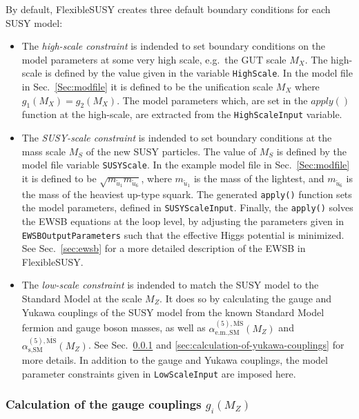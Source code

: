 \documentclass[final,3p,11pt,pdflatex]{elsarticle}
\newcommand{\fs}{FlexibleSUSY\xspace}
\newcommand{\code}[1]{\lstinline|#1|}  %
\newcommand{\textoverline}[1]{$\overline{\mbox{#1}}$}
\newcommand{\MSbar}{\textoverline{MS}\xspace}
\newcommand{\secref}[1]{Sec.~\ref{#1}}
\begin{document}
By default, \fs creates three default boundary conditions for each
SUSY model:
%
\begin{itemize}
\item The \emph{high-scale constraint} is indended to set boundary
  conditions on the model parameters at some very high scale, e.g.\
  the GUT scale $M_X$.  The high-scale is defined by the value given
  in the variable \code{HighScale}.  In the model file in
  \secref{Sec:modfile} it is defined to be the unification scale $M_X$
  where $g_1(M_X) = g_2(M_X)$.  The model parameters which, are set in
  the $apply()$ function at the high-scale, are extracted from the
  \code{HighScaleInput} variable.

\item The \emph{SUSY-scale constraint} is indended to set boundary
  conditions at the mass scale $M_S$ of the new SUSY particles.  The
  value of $M_S$ is defined by the model file variable
  \code{SUSYScale}.  In the example model file in \secref{Sec:modfile}
  it is defined to be $\sqrt{m_{\tilde{u}_1} m_{\tilde{u}_6}}$, where
  $m_{\tilde{u}_1}$ is the mass of the lightest, and $m_{\tilde{u}_6}$
  is the mass of the heaviest up-type squark.  The generated
  \code{apply()} function sets the model parameters, defined in
  \code{SUSYScaleInput}.  Finally, the \code{apply()} solves the EWSB
  equations at the loop level, by adjusting the parameters given in
  \code{EWSBOutputParameters} such that the effective Higgs potential
  is minimized.  See \secref{sec:ewsb} for a more detailed description
  of the EWSB in \fs.

\item The \emph{low-scale constraint} is indended to match the SUSY
  model to the Standard Model at the scale $M_Z$.  It does so by
  calculating the gauge and Yukawa couplings of the SUSY model from
  the known Standard Model fermion and gauge boson masses, as well as
  $\alpha_{\text{e.m.},\text{SM}}^{(5),\text{\MSbar}}(M_Z)$ and
  $\alpha_{\text{s},\text{SM}}^{(5),\text{\MSbar}}(M_Z)$.  See
  \secref{sec:calculation-of-gauge-couplings} and
  \ref{sec:calculation-of-yukawa-couplings} for more details.  In
  addition to the gauge and Yukawa couplings, the model parameter
  constraints given in \code{LowScaleInput} are imposed here.
\end{itemize}

\subsubsection{Calculation of the gauge couplings $g_i(M_Z)$}
\label{sec:calculation-of-gauge-couplings}
\end{document}

